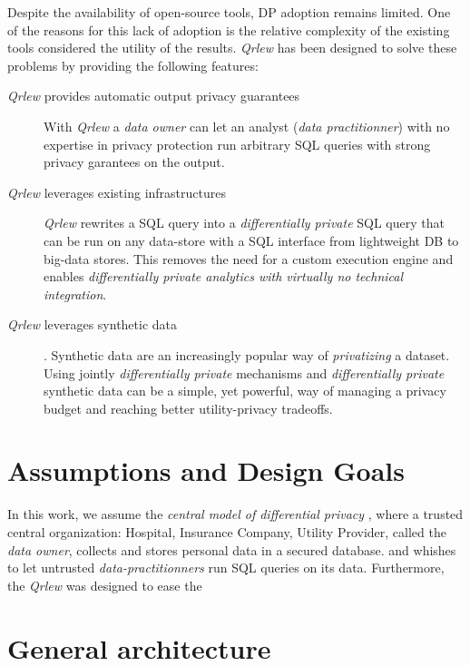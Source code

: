 \documentclass[letterpaper]{article} %
\newcommand{\qrlew}{\emph{Qrlew}}
\begin{document}
Despite the availability of open-source tools, DP adoption remains limited.
One of the reasons for this lack of adoption is the relative complexity of the existing tools considered the utility of the results.
\qrlew{} has been designed to solve these problems by providing the following features:
\begin{description}
    \item[\qrlew{} provides automatic output privacy guarantees] With \qrlew{} a \emph{data owner} can let an analyst (\emph{data practitionner}) with no expertise in privacy protection run arbitrary SQL queries with strong privacy garantees on the output.
    \item[\qrlew{} leverages existing infrastructures] \qrlew{} rewrites a SQL query into a \emph{differentially private} SQL query that can be run on any data-store with a SQL interface from lightweight DB to big-data stores.
This removes the need for a custom execution engine and enables \emph{differentially private analytics with virtually no technical integration}.
    \item[\qrlew{} leverages synthetic data]. Synthetic data are an increasingly popular way of \emph{privatizing} a dataset. Using jointly \emph{differentially private} mechanisms and \emph{differentially private} synthetic data can be a simple, yet powerful, way of managing a privacy budget and reaching better utility-privacy tradeoffs.
\end{description}



\section{Assumptions and Design Goals}

In this work, we assume the \emph{central model of differential privacy} \cite{near2020threat}, where a trusted central organization: Hospital, Insurance Company, Utility Provider, called the \emph{data owner}, collects and stores personal data in a secured database. and whishes to let untrusted \emph{data-practitionners} run SQL queries on its data.
Furthermore, the
\qrlew{} was designed to ease the

\section{General architecture}
\end{document}
